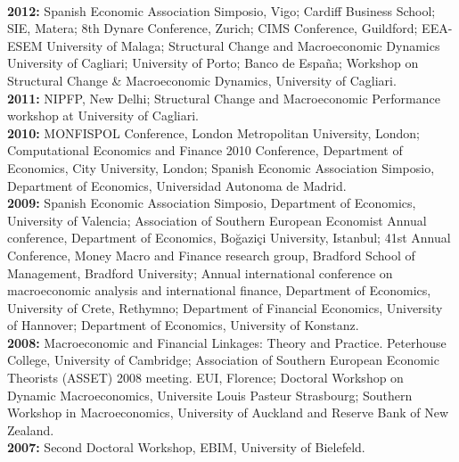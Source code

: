 \documentclass[margin, 11pt]{res} %
\begin{document}
\begin{resume}
\\
\textbf{2012:} {Spanish Economic Association Simposio, Vigo; Cardiff Business School; SIE, Matera; 8th Dynare Conference, Zurich; CIMS Conference, Guildford; EEA-ESEM University of Malaga; Structural Change and Macroeconomic Dynamics University of Cagliari; University of Porto; Banco de Espa\~{n}a; Workshop on Structural Change \& Macroeconomic Dynamics, University of Cagliari.}
\\
\textbf{2011:} {NIPFP, New Delhi; Structural Change and Macroeconomic Performance workshop at University of 
Cagliari.}
\\
\textbf{2010:} {MONFISPOL Conference, London Metropolitan University, London; Computational Economics and Finance 2010 Conference, Department of Economics,  City University, London; Spanish Economic Association Simposio, Department of Economics,  Universidad Autonoma de Madrid. }
\\
\textbf{2009:} {Spanish Economic Association Simposio, Department of Economics,  University of Valencia; Association of Southern European Economist Annual conference, Department of Economics, Bo\u{g}azi\c{c}i University, Istanbul; 41st Annual Conference, Money Macro and Finance research group, Bradford School of Management, Bradford University; Annual international conference on macroeconomic analysis and international finance, Department of Economics, University of Crete, Rethymno; Department of Financial Economics, University of Hannover; Department of Economics, University of Konstanz.}
\\
\textbf{2008:} {Macroeconomic and Financial Linkages: Theory and Practice. Peterhouse College, University of Cambridge; Association of Southern European Economic Theorists (ASSET) 2008 meeting. EUI, Florence; Doctoral Workshop on Dynamic Macroeconomics, Universite Louis Pasteur Strasbourg; Southern Workshop in Macroeconomics, University of Auckland and Reserve Bank of New Zealand.}
\\
\textbf{2007:} {Second Doctoral Workshop, EBIM, University of Bielefeld.}



\end{resume}
\end{document}
